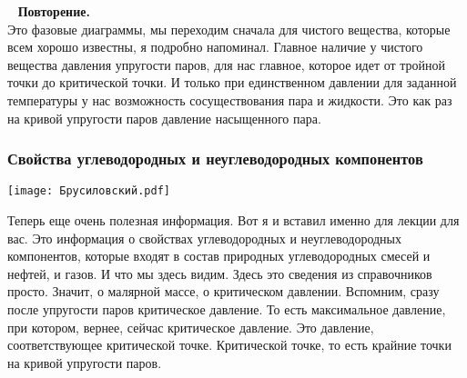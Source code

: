 \documentclass[main.tex]{subfiles}
\begin{document}
\ \newline
\textbf{Повторение.}\\
Это фазовые диаграммы, мы переходим сначала для чистого вещества, которые всем хорошо известны, я подробно напоминал.
Главное наличие у чистого вещества давления упругости паров, для нас главное, которое идет от тройной точки до критической точки.
И только при единственном давлении для заданной температуры у нас возможность сосуществования пара и жидкости.
Это как раз на кривой упругости паров давление насыщенного пара.

\subsubsection{Свойства углеводородных и неуглеводородных компонентов}

\begin{center}
\texttt{[image: Брусиловский.pdf]}
\end{center}

Теперь еще очень полезная информация.
Вот я и вставил именно для лекции для вас.
Это информация о свойствах углеводородных и неуглеводородных компонентов, которые входят в состав природных углеводородных смесей и нефтей, и газов.
И что мы здесь видим.
Здесь это сведения из справочников просто.
Значит, о малярной массе, о критическом давлении.
Вспомним, сразу после упругости паров критическое давление.
То есть максимальное давление, при котором, вернее, сейчас
критическое давление.
Это давление, соответствующее критической точке.
Критической точке, то есть крайние точки на кривой упругости паров.
\end{document}
